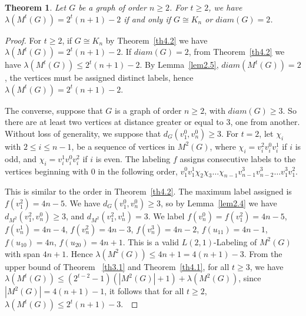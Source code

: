 \documentclass{article}
\newtheorem{theorem} {Theorem}
\newtheorem{open problem} {Open Problem}
\numberwithin{lemma}{section}
\numberwithin{theorem}{section}
\numberwithin{cor}{section}
\numberwithin{prop}{section}
\numberwithin{con}{section}
\numberwithin{claim}{section}
\numberwithin{obs}{section}
\numberwithin{dnt}{section}
\begin{document}
\begin{theorem}\label{th4.4}
	Let $G$ be a graph of order $n\geq 2$. For $t\geq 2$, we have
	$\lambda(M^t(G))= 2^t(n+1)-2$ if and only if $G \cong K_n$ or $diam(G)=2$. 	
\end{theorem}
\begin{proof}
	For $t\geq2$, if $G\cong K_n$ by Theorem~\ref{th4.2} we have $\lambda(M^t(G))=2^t(n+1)-2$. If $diam(G)=2$, from Theorem~\ref{th4.2} we have $\lambda(M^t(G))\leq 2^t(n+1)-2$. By Lemma~\ref{lem2.5}, $diam(M^t(G))=2$, the vertices must be assigned distinct labels, hence  $\lambda(M^t(G))= 2^t(n+1)-2$.\par
	The converse, suppose that $G$ is a graph of order $n\geq 2$, with  $diam(G)\geq 3$. So there are at least two vertices at distance greater or equal to $3$, one from another. Without loss of generality, we suppose that $d_G(v^0_1,v^0_n)\geq 3$. For $t=2$, let $\chi_i$ with $2\leq i\leq n-1$, be a sequence of vertices in $M^2(G)$, where $\chi_i=v^2_iv^0_iv^1_i$ if $i$ is odd, and $\chi_i=v^1_iv^0_iv^2_i$ if $i$ is even. The labeling $f$  assigns consecutive labels to the vertices beginning with $0$ in the following order, $v^0_1v^1_1\chi_2\chi_3\ldots \chi_{n-1}v^3_{n-1}v^3_{n-2}\ldots v^3_1v^2_1$. \par This is similar to the order in Theorem~\ref{th4.2}. The maximum label assigned is $f(v^2_1)=4n-5$.   We have $d_G(v^0_1,v^0_n)\geq 3$, so by Lemma~\ref{lem2.4} we have $d_{M^2}(v^2_1,v^0_n)\geq 3$, and $d_{M^2}(v^2_1,v^1_n)=3$. We label  $f(v^0_n)=f(v^2_1)=4n-5$, $f(v^1_n)=4n-4$, $f(v^2_n)=4n-3$, $f(v^3_n)=4n-2$, $f(u_{11})=4n-1$, $f(u_{10})=4n$, $f(u_{20})=4n+1$. This is a valid $L(2,1)$-Labeling of $M^2(G)$ with span $4n+1$. Hence $\lambda(M^2(G))\leq 4n+1=4(n+1)-3$. From the upper bound of Theorem ~\ref{th3.1} and Theorem~\ref{th4.1}, for all $t\geq 3$, we have  $\lambda(M^t(G))\leq (2^{t-2}-1)(|M^2(G)|+1)+\lambda(M^2(G))$, since $|M^2(G)|=4(n+1)-1$, it follows that for all $t\geq 2$, $\lambda(M^t(G))\leq 2^t(n+1)-3$.~\end{proof}
\end{document}
